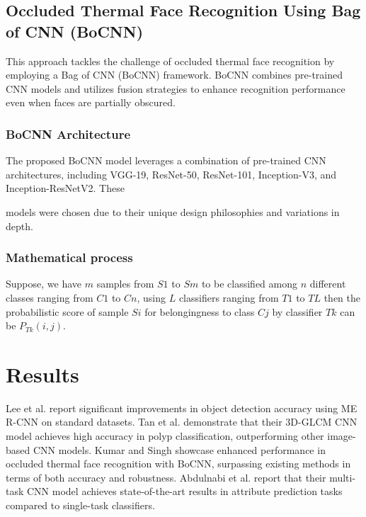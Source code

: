 \documentclass[journal]{IEEEtran}
\begin{document}
\subsection{Occluded Thermal Face Recognition Using Bag of CNN (BoCNN) \cite{kumar2020occluded}}
This approach tackles the challenge of occluded thermal face recognition by employing a Bag of CNN (BoCNN) framework. BoCNN combines pre-trained CNN models and utilizes fusion strategies to enhance recognition performance even when faces are partially obscured.

\subsubsection{BoCNN Architecture}
The proposed BoCNN model leverages a combination of pre-trained CNN architectures, including VGG-19, ResNet-50, ResNet-101, Inception-V3, and Inception-ResNetV2. These

 models were chosen due to their unique design philosophies and variations in depth.

\subsubsection{Mathematical process}
Suppose, we have $m$ samples from $S1$ to $Sm$ to be classified among $n$ different classes ranging from $C1$ to $Cn$, using $L$ classifiers ranging from $T1$ to $TL$ then the probabilistic score of sample $Si$ for belongingness to class $Cj$ by classifier $Tk$ can be $P_{Tk}(i, j)$.

\section{Results}
Lee et al. \cite{lee2020me} report significant improvements in object detection accuracy using ME R-CNN on standard datasets. Tan et al. \cite{tan20203d} demonstrate that their 3D-GLCM CNN model achieves high accuracy in polyp classification, outperforming other image-based CNN models. Kumar and Singh \cite{kumar2020occluded} showcase enhanced performance in occluded thermal face recognition with BoCNN, surpassing existing methods in terms of both accuracy and robustness. Abdulnabi et al. \cite{abdulnabi2015multi} report that their multi-task CNN model achieves state-of-the-art results in attribute prediction tasks compared to single-task classifiers.
\end{document}
